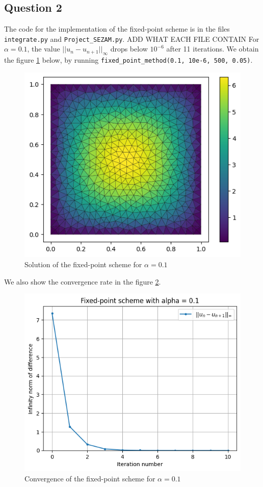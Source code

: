 \documentclass[11pt, a4paper, twoside]{article}
\begin{document}
\subsection*{Question 2}
The code for the implementation of the fixed-point scheme is in the files \verb+integrate.py+ and \verb+Project_SEZAM.py+. ADD WHAT EACH FILE CONTAIN
For $\alpha=0.1$, the value $||u_n -u_{n+1}||_\infty$ drops below $10^{-6}$ after 11 iterations. We obtain the figure \ref{q2fig1} below, by running \verb+fixed_point_method(0.1, 10e-6, 500, 0.05)+.
\begin{figure}[H]
\centering
\includegraphics[scale = 0.7]{../Figures/fixed_sol_alpha0.1.png}
\caption{Solution of the fixed-point scheme for $\alpha=0.1$}
\label{q2fig1}
\end{figure}

We also show the convergence rate in the figure \ref{q2fig2}.
\begin{figure}[H]
\centering
\includegraphics[scale = 0.7]{../Figures/fixed_conv_alpha0.1.png}
\caption{Convergence of the fixed-point scheme for $\alpha=0.1$}
\label{q2fig2}
\end{figure}
\end{document}
